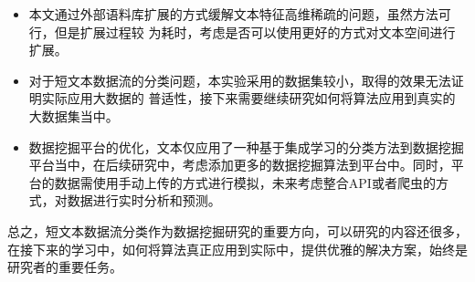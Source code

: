\begin{itemize}
\item 本文通过外部语料库扩展的方式缓解文本特征高维稀疏的问题，虽然方法可行，但是扩展过程较
  为耗时，考虑是否可以使用更好的方式对文本空间进行扩展。
\item 对于短文本数据流的分类问题，本实验采用的数据集较小，取得的效果无法证明实际应用大数据的
普适性，接下来需要继续研究如何将算法应用到真实的大数据集当中。
\item 数据挖掘平台的优化，文本仅应用了一种基于集成学习的分类方法到数据挖掘平台当中，在后续研究中，考虑添加更多的数据挖掘算法到平台中。同时，平台的数据需使用手动上传的方式进行模拟，未来考虑整合API或者爬虫的方式，对数据进行实时分析和预测。
\end{itemize}

总之，短文本数据流分类作为数据挖掘研究的重要方向，可以研究的内容还很多，在接下来的学习中，如何将算法真正应用到实际中，提供优雅的解决方案，始终是研究者的重要任务。